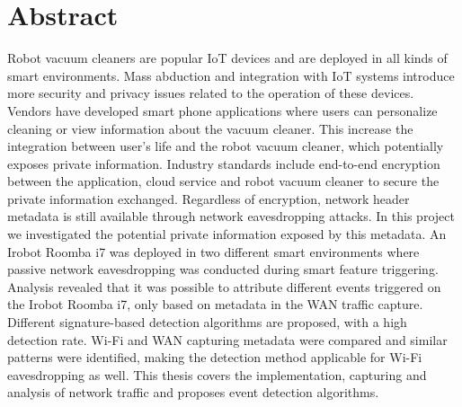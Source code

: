 \chapter*{Abstract}

Robot vacuum cleaners are popular IoT devices and are deployed in all kinds of smart environments. Mass abduction and integration with IoT systems introduce more security and privacy issues related to the operation of these devices. Vendors have developed smart phone applications where users can personalize cleaning or view information about the vacuum cleaner. This increase the integration between user's life and the robot vacuum cleaner, which potentially exposes private information. Industry standards include end-to-end encryption between the application, cloud service and robot vacuum cleaner to secure the private information exchanged. Regardless of encryption, network header metadata is still available through network eavesdropping attacks. In this project we investigated the potential private information exposed by this metadata. An Irobot Roomba i7 was deployed in two different smart environments where passive network eavesdropping was conducted during smart feature triggering. Analysis revealed that it was possible to attribute different events triggered on the Irobot Roomba i7, only based on metadata in the WAN traffic capture. Different signature-based detection algorithms are proposed, with a high detection rate. Wi-Fi and WAN capturing metadata were compared and similar patterns were identified, making the detection method applicable for Wi-Fi eavesdropping as well. This thesis covers the implementation, capturing and analysis of network traffic and proposes event detection algorithms.    


